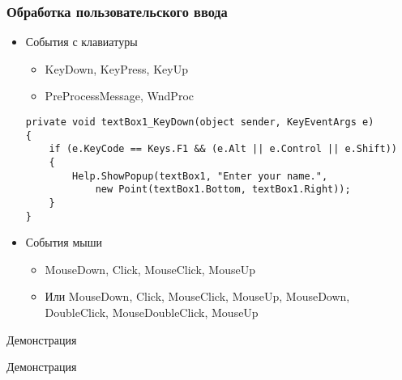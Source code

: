 \documentclass{../../slides-style}
\begin{document}
    \begin{frame}[fragile]
        \frametitle{Обработка пользовательского ввода}
        \begin{itemize}
            \item События с клавиатуры
            \begin{itemize}
                \item KeyDown, KeyPress, KeyUp
                \item PreProcessMessage, WndProc
            \end{itemize}
            \begin{scriptsize}
                \begin{verbatim}
private void textBox1_KeyDown(object sender, KeyEventArgs e)
{
    if (e.KeyCode == Keys.F1 && (e.Alt || e.Control || e.Shift))
    {
        Help.ShowPopup(textBox1, "Enter your name.", 
            new Point(textBox1.Bottom, textBox1.Right));
    }
}
                \end{verbatim}
            \end{scriptsize}
            \item События мыши
            \begin{itemize}
                \item MouseDown, Click, MouseClick, MouseUp
                \item Или MouseDown, Click, MouseClick, MouseUp, MouseDown, DoubleClick, MouseDoubleClick, MouseUp
            \end{itemize}
        \end{itemize}
    \end{frame}

    \begin{frame}{Демонстрация}
        \begin{Huge}\begin{center}Демонстрация\end{center}\end{Huge}
    \end{frame}
\end{document}

